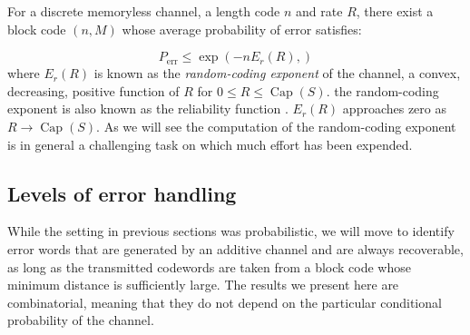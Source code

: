 \indent For a discrete memoryless channel, a length code $n$ and rate $R$, there exist a block code $(n,M)$ whose average probability of error satisfies:

\begin{equation}
P_{\text{err}}\leq \operatorname{exp}(-n E_{r}(R),)
\end{equation}
where $E_r(R)$ is known as the \textit{random-coding exponent} of the channel, a convex, decreasing, positive function of $R$ for $0\leq R\leq \operatorname{Cap}(S)$. the random-coding exponent is also known as the reliability function \cite{gallager_information_1968}. $E_r(R)$ approaches zero as $R\to  \operatorname{Cap}(S)$. As we will see the computation of the random-coding exponent is in general a challenging task on which much effort has been expended.


\subsection{Levels of error handling}
While the setting in previous sections was probabilistic, we will move to identify error words that are generated by an additive channel and are always recoverable, as long as the transmitted codewords are taken from a block code whose minimum distance is sufficiently large. The results we present here are combinatorial, meaning that they do not depend on the particular conditional probability of the channel.
